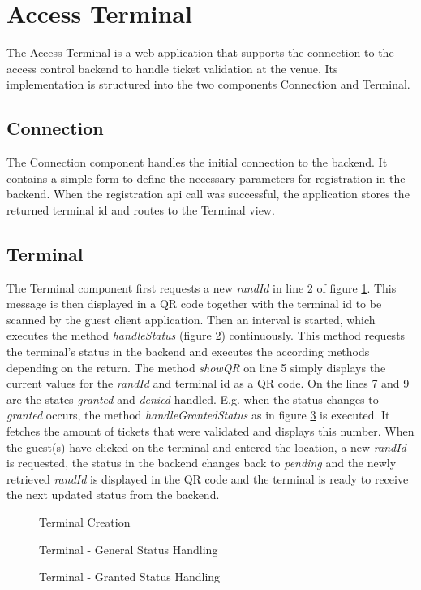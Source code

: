 \section{Access Terminal}\label{imp:terminal}
The Access Terminal is a web application that supports the connection to the access control backend to handle ticket validation at the venue. Its implementation is structured into the two components Connection and Terminal.

\subsection{Connection}
The Connection component handles the initial connection to the backend. It contains a simple form to define the necessary parameters for registration in the backend. When the registration api call was successful, the application stores the returned terminal id and routes to the Terminal view.

\subsection{Terminal}
The Terminal component first requests a new \textit{randId} in line 2 of figure \ref{code:terminal-start}. This message is then displayed in a QR code together with the terminal id to be scanned by the guest client application. Then an interval is started, which executes the method \textit{handleStatus} (figure \ref{code:terminal-status-handling}) continuously. This method requests the terminal's status in the backend and executes the according methods depending on the return. The method \textit{showQR} on line 5 simply displays the current values for the \textit{randId} and terminal id as a QR code. On the lines 7 and 9 are the states \textit{granted} and \textit{denied} handled. E.g. when the status changes to \textit{granted} occurs, the method \textit{handleGrantedStatus} as in figure \ref{code:terminal-handle-granted} is executed. It fetches the amount of tickets that were validated and displays this number. When the guest(s) have clicked on the terminal and entered the location, a new \textit{randId} is requested, the status in the backend changes back to \textit{pending} and the newly retrieved \textit{randId} is displayed in the QR code and the terminal is ready to receive the next updated status from the backend.

\begin{figure}[H]
    
    \caption{Terminal Creation}
    \label{code:terminal-start}
\end{figure}

\begin{figure}[H]
    
    \caption{Terminal - General Status Handling}
    \label{code:terminal-status-handling}
\end{figure}

\begin{figure}[H]
    
    \caption{Terminal - Granted Status Handling}
    \label{code:terminal-handle-granted}
\end{figure}
